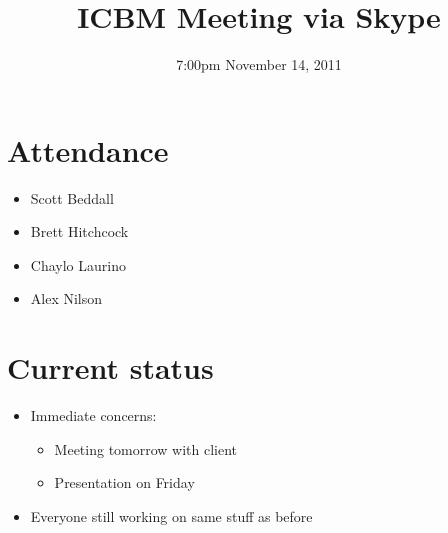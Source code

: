 \documentclass{article}
\begin{document}
\title{ICBM Meeting via Skype}
\date{7:00pm November 14, 2011}
\maketitle

\section{Attendance}
\begin{itemize}
\item Scott Beddall
\item Brett Hitchcock
\item Chaylo Laurino
\item Alex Nilson
\end{itemize}

\section{Current status}
\begin{itemize}
\item Immediate concerns:
	\begin{itemize}
	\item Meeting tomorrow with client
	\item Presentation on Friday
	\end{itemize}
\item Everyone still working on same stuff as before
\end{itemize}
\end{document}
